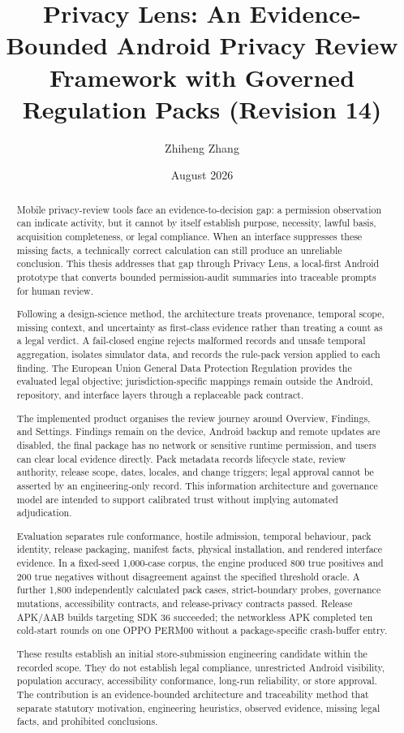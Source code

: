 \documentclass[11pt,a4paper]{article}
\title{Privacy Lens: An Evidence-Bounded Android Privacy Review Framework with Governed Regulation Packs (Revision 14)}
\author{Zhiheng Zhang}
\date{August 2026}
\begin{document}
\maketitle
\begin{abstract}
\small\singlespacing
Mobile privacy-review tools face an evidence-to-decision gap: a permission observation can indicate activity, but it cannot by itself establish purpose, necessity, lawful basis, acquisition completeness, or legal compliance. When an interface suppresses these missing facts, a technically correct calculation can still produce an unreliable conclusion. This thesis addresses that gap through Privacy Lens, a local-first Android prototype that converts bounded permission-audit summaries into traceable prompts for human review.

Following a design-science method, the architecture treats provenance, temporal scope, missing context, and uncertainty as first-class evidence rather than treating a count as a legal verdict. A fail-closed engine rejects malformed records and unsafe temporal aggregation, isolates simulator data, and records the rule-pack version applied to each finding. The European Union General Data Protection Regulation provides the evaluated legal objective; jurisdiction-specific mappings remain outside the Android, repository, and interface layers through a replaceable pack contract.

The implemented product organises the review journey around Overview, Findings, and Settings. Findings remain on the device, Android backup and remote updates are disabled, the final package has no network or sensitive runtime permission, and users can clear local evidence directly. Pack metadata records lifecycle state, review authority, release scope, dates, locales, and change triggers; legal approval cannot be asserted by an engineering-only record. This information architecture and governance model are intended to support calibrated trust without implying automated adjudication.

Evaluation separates rule conformance, hostile admission, temporal behaviour, pack identity, release packaging, manifest facts, physical installation, and rendered interface evidence. In a fixed-seed 1,000-case corpus, the engine produced 800 true positives and 200 true negatives without disagreement against the specified threshold oracle. A further 1,800 independently calculated pack cases, strict-boundary probes, governance mutations, accessibility contracts, and release-privacy contracts passed. Release APK/AAB builds targeting SDK 36 succeeded; the networkless APK completed ten cold-start rounds on one OPPO PERM00 without a package-specific crash-buffer entry.

These results establish an initial store-submission engineering candidate within the recorded scope. They do not establish legal compliance, unrestricted Android visibility, population accuracy, accessibility conformance, long-run reliability, or store approval. The contribution is an evidence-bounded architecture and traceability method that separate statutory motivation, engineering heuristics, observed evidence, missing legal facts, and prohibited conclusions.
\end{abstract}
\end{document}
